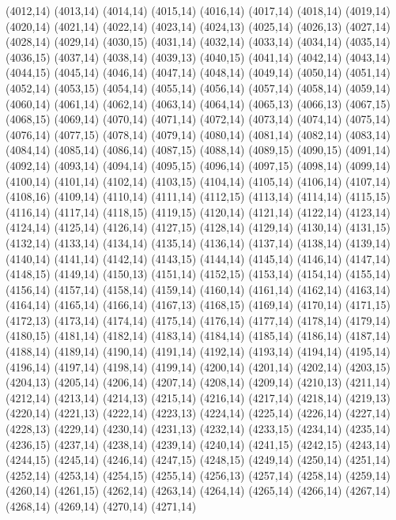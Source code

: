 (4012,14)
(4013,14)
(4014,14)
(4015,14)
(4016,14)
(4017,14)
(4018,14)
(4019,14)
(4020,14)
(4021,14)
(4022,14)
(4023,14)
(4024,13)
(4025,14)
(4026,13)
(4027,14)
(4028,14)
(4029,14)
(4030,15)
(4031,14)
(4032,14)
(4033,14)
(4034,14)
(4035,14)
(4036,15)
(4037,14)
(4038,14)
(4039,13)
(4040,15)
(4041,14)
(4042,14)
(4043,14)
(4044,15)
(4045,14)
(4046,14)
(4047,14)
(4048,14)
(4049,14)
(4050,14)
(4051,14)
(4052,14)
(4053,15)
(4054,14)
(4055,14)
(4056,14)
(4057,14)
(4058,14)
(4059,14)
(4060,14)
(4061,14)
(4062,14)
(4063,14)
(4064,14)
(4065,13)
(4066,13)
(4067,15)
(4068,15)
(4069,14)
(4070,14)
(4071,14)
(4072,14)
(4073,14)
(4074,14)
(4075,14)
(4076,14)
(4077,15)
(4078,14)
(4079,14)
(4080,14)
(4081,14)
(4082,14)
(4083,14)
(4084,14)
(4085,14)
(4086,14)
(4087,15)
(4088,14)
(4089,15)
(4090,15)
(4091,14)
(4092,14)
(4093,14)
(4094,14)
(4095,15)
(4096,14)
(4097,15)
(4098,14)
(4099,14)
(4100,14)
(4101,14)
(4102,14)
(4103,15)
(4104,14)
(4105,14)
(4106,14)
(4107,14)
(4108,16)
(4109,14)
(4110,14)
(4111,14)
(4112,15)
(4113,14)
(4114,14)
(4115,15)
(4116,14)
(4117,14)
(4118,15)
(4119,15)
(4120,14)
(4121,14)
(4122,14)
(4123,14)
(4124,14)
(4125,14)
(4126,14)
(4127,15)
(4128,14)
(4129,14)
(4130,14)
(4131,15)
(4132,14)
(4133,14)
(4134,14)
(4135,14)
(4136,14)
(4137,14)
(4138,14)
(4139,14)
(4140,14)
(4141,14)
(4142,14)
(4143,15)
(4144,14)
(4145,14)
(4146,14)
(4147,14)
(4148,15)
(4149,14)
(4150,13)
(4151,14)
(4152,15)
(4153,14)
(4154,14)
(4155,14)
(4156,14)
(4157,14)
(4158,14)
(4159,14)
(4160,14)
(4161,14)
(4162,14)
(4163,14)
(4164,14)
(4165,14)
(4166,14)
(4167,13)
(4168,15)
(4169,14)
(4170,14)
(4171,15)
(4172,13)
(4173,14)
(4174,14)
(4175,14)
(4176,14)
(4177,14)
(4178,14)
(4179,14)
(4180,15)
(4181,14)
(4182,14)
(4183,14)
(4184,14)
(4185,14)
(4186,14)
(4187,14)
(4188,14)
(4189,14)
(4190,14)
(4191,14)
(4192,14)
(4193,14)
(4194,14)
(4195,14)
(4196,14)
(4197,14)
(4198,14)
(4199,14)
(4200,14)
(4201,14)
(4202,14)
(4203,15)
(4204,13)
(4205,14)
(4206,14)
(4207,14)
(4208,14)
(4209,14)
(4210,13)
(4211,14)
(4212,14)
(4213,14)
(4214,13)
(4215,14)
(4216,14)
(4217,14)
(4218,14)
(4219,13)
(4220,14)
(4221,13)
(4222,14)
(4223,13)
(4224,14)
(4225,14)
(4226,14)
(4227,14)
(4228,13)
(4229,14)
(4230,14)
(4231,13)
(4232,14)
(4233,15)
(4234,14)
(4235,14)
(4236,15)
(4237,14)
(4238,14)
(4239,14)
(4240,14)
(4241,15)
(4242,15)
(4243,14)
(4244,15)
(4245,14)
(4246,14)
(4247,15)
(4248,15)
(4249,14)
(4250,14)
(4251,14)
(4252,14)
(4253,14)
(4254,15)
(4255,14)
(4256,13)
(4257,14)
(4258,14)
(4259,14)
(4260,14)
(4261,15)
(4262,14)
(4263,14)
(4264,14)
(4265,14)
(4266,14)
(4267,14)
(4268,14)
(4269,14)
(4270,14)
(4271,14)
